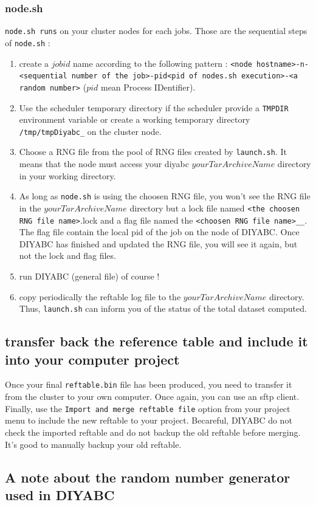 \subsubsection{node.sh}
\texttt{node.sh runs} on your cluster nodes for each jobs. Those are the sequential steps of \texttt{node.sh} :
\begin{enumerate}
    \item create a $job id$ name according to the following pattern : \texttt{<node hostname>-n-<sequential number of the job>-pid<pid of nodes.sh execution>-<a random number>} ($pid$ mean Process IDentifier).
    \item Use the scheduler temporary directory if the scheduler provide a \texttt{TMPDIR} environment variable or create a working temporary directory \texttt{/tmp/tmpDiyabc\_<job id>} on the cluster node.
    \item Choose a RNG file from the pool of RNG files created by \texttt{launch.sh}. It means that the node must access your diyabc $yourTarArchiveName$ directory in your working directory. 
    \item As long as \texttt{node.sh} is using the choosen RNG file, you won't see the RNG file in the $yourTarArchiveName$ directory but a lock file named \texttt{<the choosen RNG file name>}.lock and a flag file named the \texttt{<choosen RNG file name>\_<date of the run>\_<job id>}. The flag file contain the local pid of the job on the node of DIYABC. Once DIYABC has finished and updated the RNG file, you will see it again, but not the lock and flag files.
    \item run DIYABC (general file) of course !
    \item copy periodically the reftable log file to the $yourTarArchiveName$ directory. Thus, \texttt{launch.sh} can inform you of the status of the total dataset computed.
\end{enumerate}



\subsection{transfer back the reference table and include it into your computer project}\label{clusterback}
Once your final \texttt{reftable.bin} file has been produced, you need to transfer it from the cluster to  your own computer. Once again, you can use an sftp client. Finally, use the \texttt{Import and merge reftable file} option from your project menu to include the new reftable to your project. Becareful, DIYABC do not check the imported reftable and do not backup the old reftable before merging. It's good to manually backup your old reftable. 


\clearpage
\subsection{A note about the random number generator used in DIYABC}\label{rng}



  
